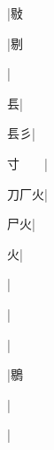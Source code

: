 \begin{multicols}{2}
{{\cjk{}{\cnsym{}　}{\cnsym{}　}{\cnsym{}　}}|{\cjk{}敡}\par
{\cjk{}{\cnsym{}　}{\cnsym{}　}{\cnsym{}　}}|{\cjk{}剔}\par
{}|{}\par
{\cjk{}{\cnsym{}　}{\cnsym{}　}镸}|{}\par
{\cjk{}{\cnsym{}　}镸彡}|{}\par
{\cjk{}寸{\cnsym{}　}{\cnsym{}　}}|{}\par
{\cjk{}刀厂火}|{}\par
{\cjk{}{\cnsym{}　}尸火}|{}\par
{火}|{}\par
{\cjk{}{\cnsym{}　}{\cnsym{}　}{\cnsym{}　}}|{}\par
{\cjk{}{\cnsym{}　}{\cnsym{}　}{\cnsym{}　}}|{}\par
{\cjk{}{\cnsym{}　}{\cnsym{}　}{\cnsym{}　}}|{}\par
{\cjk{}{\cnsym{}　}{\cnsym{}　}{\cnsym{}　}}|{\cjk{}鶍}\par
{}|{}\par
{\cjk{}{\cnsym{}　}{\cnsym{}　}{\cnsym{}　}}|{}\par
}
\end{multicols}
